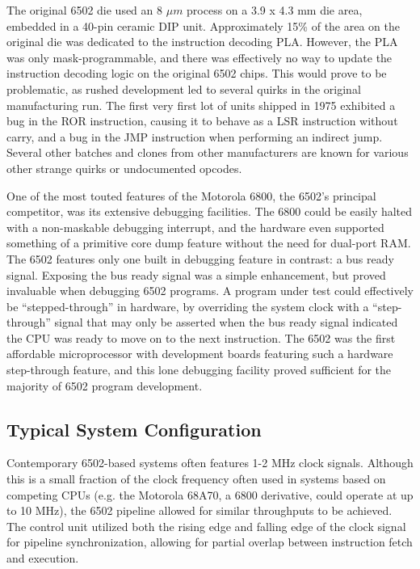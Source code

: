 \documentclass[journal]{IEEEtran}
\begin{document}
The original 6502 die used an 8 $\mu m$ process on a 3.9 x 4.3 mm die area,
embedded in a 40-pin ceramic DIP unit. Approximately 15\% of the area on the
original die was dedicated to the instruction decoding PLA. However, the PLA was
only mask-programmable, and there was effectively no way to update the
instruction decoding logic on the original 6502 chips. This would prove to be
problematic, as rushed development led to several quirks in the original
manufacturing run. The first very first lot of units shipped in 1975 exhibited
a bug in the ROR instruction, causing it to behave as a LSR
instruction without carry, and a bug in the JMP instruction when
performing an indirect jump. Several other batches and clones from other
manufacturers are known for various other strange quirks or undocumented
opcodes.

One of the most touted features of the Motorola 6800, the 6502's principal
competitor, was its extensive debugging facilities. The 6800 could be easily
halted with a non-maskable debugging interrupt, and the hardware even supported
something of a primitive core dump feature without the need for dual-port RAM.
The 6502 features only one built in debugging feature in contrast: a bus ready
signal. Exposing the bus ready signal was a simple enhancement, but proved
invaluable when debugging 6502 programs. A program under test could effectively
be ``stepped-through'' in hardware, by overriding the system clock with a
``step-through'' signal that may only be asserted when the bus ready signal
indicated the CPU was ready to move on to the next instruction. The 6502 was the
first affordable microprocessor with development boards featuring such a
hardware step-through feature, and this lone debugging facility proved
sufficient for the majority of 6502 program development.

\subsection{Typical System Configuration}

Contemporary 6502-based systems often features 1-2 MHz clock signals. Although
this is a small fraction of the clock frequency often used in systems based on
competing CPUs (e.g. the Motorola 68A70, a 6800 derivative, could operate at up
to 10 MHz), the 6502 pipeline allowed for similar throughputs to be achieved.
The control unit utilized both the rising edge and falling edge of the clock
signal for pipeline synchronization, allowing for partial overlap between
instruction fetch and execution.
\end{document}
